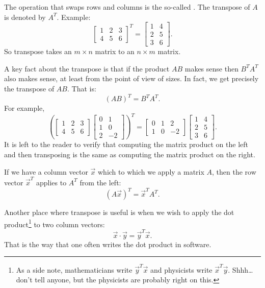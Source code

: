 The operation that swaps rows and columns is the so-called
\emph{}.
The transpose of $A$ is denoted by $A^T$.  Example:
\begin{equation*}
\begin{bmatrix}
1 & 2 & 3 \\
4 & 5 & 6
\end{bmatrix}^T =
\begin{bmatrix}
1 & 4 \\
2 & 5 \\
3 & 6 
\end{bmatrix} .
\end{equation*}
So transpose takes an $m \times n$ matrix to an $n \times m$ matrix.

A key fact about the transpose is that if the product $AB$ makes sense
then $B^TA^T$ also makes sense, at least from the point of view of sizes.
In fact, we get precisely the transpose of $AB$.  That is:
\begin{equation*}
{(AB)}^T = B^TA^T .
\end{equation*}
For example,
\begin{equation*}
{\left(
\begin{bmatrix}
1 & 2 & 3 \\
4 & 5 & 6
\end{bmatrix}
\begin{bmatrix}
0 & 1 \\
1 & 0 \\
2 & -2
\end{bmatrix}
\right)}^T =
\begin{bmatrix}
0 & 1 & 2 \\
1 & 0 & -2
\end{bmatrix}
\begin{bmatrix}
1 & 4 \\
2 & 5 \\
3 & 6 
\end{bmatrix} .
\end{equation*}
It is left to the reader to verify that computing the matrix product on the
left and then transposing is the same as computing the matrix product on the
right.

If we have a column vector $\vec{x}$ which to which we apply a matrix $A$,
then the row vector $\vec{x}^T$ applies to $A^T$ from the left:
\begin{equation*}
{(A\vec{x})}^T = \vec{x}^TA^T .
\end{equation*}

Another place where transpose is useful is when we wish to apply the dot
product\footnote{As a side note, mathematicians
write $\vec{y}^T\vec{x}$ and physicists
write $\vec{x}^T\vec{y}$.  Shhh\ldots don't tell anyone, but the physicists
are probably right on this.}
to two column vectors:
\begin{equation*}
\vec{x} \cdot \vec{y} = \vec{y}^T \vec{x} .
\end{equation*}
That is the way that one often writes the dot product in software.

